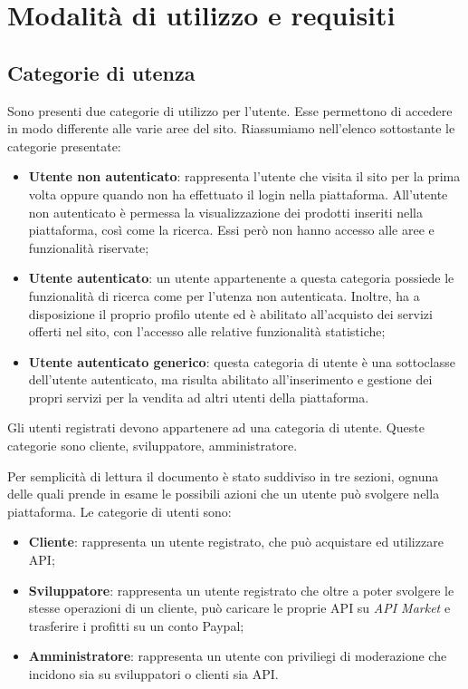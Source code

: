 \newpage
\section{Modalità di utilizzo e requisiti}

\subsection{Categorie di utenza}
Sono presenti due categorie di utilizzo per l'utente. Esse permettono di accedere in modo differente alle varie aree del sito. Riassumiamo nell'elenco sottostante le categorie presentate:

\begin{itemize}
	\item \textbf{Utente non autenticato}: rappresenta l'utente che visita il sito per la prima volta oppure quando non ha effettuato il login nella piattaforma. All'utente non autenticato è permessa la visualizzazione dei prodotti inseriti nella piattaforma, così come la ricerca. Essi però non hanno accesso alle aree e funzionalità riservate;
	\item \textbf{Utente autenticato}: un utente appartenente a questa categoria possiede le funzionalità di ricerca come per l'utenza non autenticata. Inoltre, ha a disposizione il proprio profilo utente ed è abilitato all'acquisto dei servizi offerti nel sito, con l'accesso alle relative funzionalità statistiche;
	\item \textbf{Utente autenticato generico}: questa categoria di utente è una sottoclasse dell'utente autenticato, ma risulta abilitato all'inserimento e gestione dei propri servizi per la vendita ad altri utenti della piattaforma. 
\end{itemize}

Gli utenti registrati devono appartenere ad una categoria di utente. Queste categorie sono cliente, sviluppatore, amministratore.

Per semplicità di lettura il documento è stato suddiviso in tre sezioni, ognuna delle quali prende in esame le possibili azioni che un utente può svolgere nella piattaforma. Le categorie di utenti sono:
\begin{itemize}
	\item \textbf{Cliente}: rappresenta un utente registrato, che può acquistare ed utilizzare API;
	\item \textbf{Sviluppatore}: rappresenta un utente registrato che oltre a poter svolgere le stesse operazioni di un cliente, può caricare le proprie API su \textit{API Market} e trasferire i profitti su un conto Paypal;
	\item \textbf{Amministratore}: rappresenta un utente con priviliegi di moderazione che incidono sia su sviluppatori o clienti sia API.
\end{itemize}

